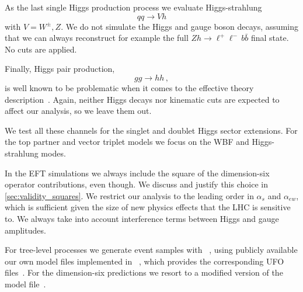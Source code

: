 As the last single Higgs production process we evaluate
Higgs-strahlung
%
\begin{equation}
  q q \to V h
\end{equation}
%
with $V = W^\pm, Z$. We do not simulate the Higgs and gauge boson
decays, assuming that we can always reconstruct for example the full
$Zh \to \ell^+ \ell^- \, b \bar{b}$ final state. No cuts are applied.

Finally, Higgs pair production,
%
\begin{equation}
  g g \to h h \,,
\end{equation}
%
is well known to be problematic when it comes to the effective theory
description~\cite{Baur:2002rb, Gillioz:2012se, Dawson:2012mk}. Again,
neither Higgs decays nor kinematic cuts are expected to affect our
analysis, so we leave them out.

\newparagraph
%
We test all these channels for the singlet and doublet Higgs sector
extensions. For the top partner and vector triplet models we focus on
the WBF and Higgs-strahlung modes.

In the EFT simulations we always include the square of the
dimension-six operator contributions, even though. We discuss and
justify this choice in \autoref{sec:validity_squares}.
%
%
We restrict our analysis to the leading order in $\alpha_s$ and
$\alpha_{ew}$, which is sufficient given the size of new physics
effects that the LHC is sensitive to. We always take into account
interference terms between Higgs and gauge amplitudes.

For tree-level processes we generate event samples with
~\cite{Alwall:2014hca}, using publicly available
our own model files implemented in
~\cite{Alloul:2013bka}, which provides the
corresponding UFO files~\cite{Degrande:2011ua}.  For the dimension-six
predictions we resort to a modified version of the 
model file~\cite{Alloul:2013naa}.

